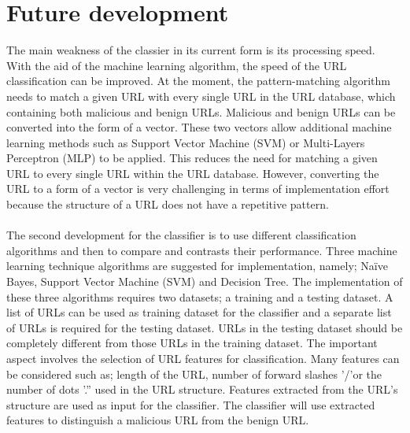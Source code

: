 \section{Future development}

The main weakness of the classier in its current form is its processing speed. With the aid of the machine learning algorithm, the speed of the URL classification can be improved. At the moment, the pattern-matching algorithm needs to match a given URL with every single URL in the URL database, which containing both malicious and benign URLs. Malicious and benign URLs can be converted into the form of a vector. These two vectors allow additional machine learning methods such as Support Vector Machine (SVM) or Multi-Layers Perceptron (MLP) to be applied. This reduces the need for matching a given URL to every single URL within the URL database. However, converting the URL to a form of a vector is very challenging in terms of implementation effort because the structure of a URL does not have a repetitive pattern.

\paragraph{}
The second development for the classifier is to use different classification algorithms and then to compare and contrasts their performance. Three machine learning technique algorithms are suggested for implementation, namely; Naïve Bayes, Support Vector Machine (SVM) and Decision Tree. The implementation of these three algorithms requires two datasets; a training and a testing dataset. A list of URLs can be used as training dataset for the classifier and a separate list of URLs is required for the testing dataset. URLs in the testing dataset should be completely different from those URLs in the training dataset. The important aspect involves the selection of URL features for classification. Many features can be considered such as; length of the URL, number of forward slashes '/'or the number of dots '.'' used in the URL structure. Features extracted from the URL’s structure are used as input for the classifier. The classifier will use extracted features to distinguish a malicious URL from the benign URL. 

